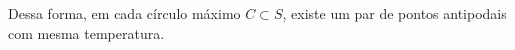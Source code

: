 \documentclass{IMTexam}
\begin{document}
\begin{questions}
\begin{solution}
			Dessa forma, em cada círculo máximo $C\subset S$, existe um par de pontos antipodais com mesma temperatura.
		\end{solution}
		
%		
%		
%	
%			
%			
%			
		
	\end{questions}
\end{document}
